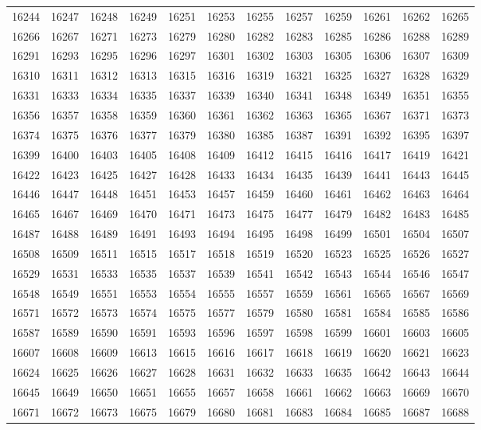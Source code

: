 \begin{center}
\begin{longtable}{llllllllllll}
16244 &16247 &16248 &16249 &16251 &16253 &16255 &16257 &16259 &16261 &16262 &16265 \\
16266 &16267 &16271 &16273 &16279 &16280 &16282 &16283 &16285 &16286 &16288 &16289 \\
16291 &16293 &16295 &16296 &16297 &16301 &16302 &16303 &16305 &16306 &16307 &16309 \\
16310 &16311 &16312 &16313 &16315 &16316 &16319 &16321 &16325 &16327 &16328 &16329 \\
16331 &16333 &16334 &16335 &16337 &16339 &16340 &16341 &16348 &16349 &16351 &16355 \\
16356 &16357 &16358 &16359 &16360 &16361 &16362 &16363 &16365 &16367 &16371 &16373 \\
16374 &16375 &16376 &16377 &16379 &16380 &16385 &16387 &16391 &16392 &16395 &16397 \\
16399 &16400 &16403 &16405 &16408 &16409 &16412 &16415 &16416 &16417 &16419 &16421 \\
16422 &16423 &16425 &16427 &16428 &16433 &16434 &16435 &16439 &16441 &16443 &16445 \\
16446 &16447 &16448 &16451 &16453 &16457 &16459 &16460 &16461 &16462 &16463 &16464 \\
16465 &16467 &16469 &16470 &16471 &16473 &16475 &16477 &16479 &16482 &16483 &16485 \\
16487 &16488 &16489 &16491 &16493 &16494 &16495 &16498 &16499 &16501 &16504 &16507 \\
16508 &16509 &16511 &16515 &16517 &16518 &16519 &16520 &16523 &16525 &16526 &16527 \\
16529 &16531 &16533 &16535 &16537 &16539 &16541 &16542 &16543 &16544 &16546 &16547 \\
16548 &16549 &16551 &16553 &16554 &16555 &16557 &16559 &16561 &16565 &16567 &16569 \\
16571 &16572 &16573 &16574 &16575 &16577 &16579 &16580 &16581 &16584 &16585 &16586 \\
16587 &16589 &16590 &16591 &16593 &16596 &16597 &16598 &16599 &16601 &16603 &16605 \\
16607 &16608 &16609 &16613 &16615 &16616 &16617 &16618 &16619 &16620 &16621 &16623 \\
16624 &16625 &16626 &16627 &16628 &16631 &16632 &16633 &16635 &16642 &16643 &16644 \\
16645 &16649 &16650 &16651 &16655 &16657 &16658 &16661 &16662 &16663 &16669 &16670 \\
16671 &16672 &16673 &16675 &16679 &16680 &16681 &16683 &16684 &16685 &16687 &16688 \\

\end{longtable}
\end{center}

